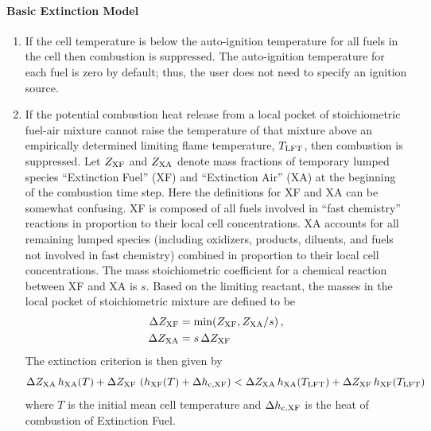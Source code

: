 \paragraph{Basic Extinction Model}
\begin{enumerate}
\item If the cell temperature is below the auto-ignition temperature for all fuels in the cell then combustion is suppressed. The auto-ignition temperature for each fuel is zero by default; thus, the user does not need to specify an ignition source.
\item If the potential combustion heat release from a local pocket of stoichiometric fuel-air mixture cannot raise the temperature of that mixture above an empirically determined limiting flame temperature, $T_{\rm LFT}$, then combustion is suppressed.  Let $Z_{\rm XF}$ and $Z_{\rm XA}$ denote mass fractions of temporary lumped species ``Extinction Fuel'' (XF) and ``Extinction Air'' (XA) at the beginning of the combustion time step.  Here the definitions for XF and XA can be somewhat confusing.  XF is composed of all fuels involved in ``fast chemistry'' reactions in proportion to their local cell concentrations. XA accounts for all remaining lumped species (including oxidizers, products, diluents, and fuels not involved in fast chemistry) combined in proportion to their local cell concentrations. The mass stoichiometric coefficient for a chemical reaction between XF and XA is $s$.  Based on the limiting reactant, the masses in the local pocket of stoichiometric mixture are defined to be
\begin{align}
\label{eq:dzf}  \Delta Z_{\rm XF} &= \min(Z_{\rm XF},Z_{\rm XA}/s)\,\mbox{,} \\
\label{eq:dza}  \Delta Z_{\rm XA} &= s \,\Delta Z_{\rm XF}
\end{align}
The extinction criterion is then given by
\begin{equation}
\label{eq:extinction}
\Delta Z_{\rm XA} \, h_{\rm XA}(T) + \Delta Z_{\rm XF} \, \left( h_{\rm XF}(T)+\Delta h_{\rm c,XF} \right) <
\Delta Z_{\rm XA} \, h_{\rm XA}(T_{\rm LFT}) + \Delta Z_{\rm XF} \, h_{\rm XF}(T_{\rm LFT})
\end{equation}
where $T$ is the initial mean cell temperature and $\Delta h_{\rm c,XF}$ is the heat of combustion of Extinction Fuel.
\end{enumerate}

